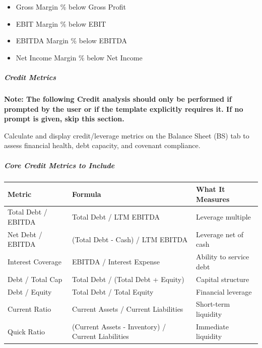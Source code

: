 \documentclass[11pt]{article}
\begin{document}
\begin{itemize}[leftmargin=*,itemsep=2pt,topsep=2pt]
\item {} Gross Margin \% below Gross Profit
\item {} EBIT Margin \% below EBIT
\item {} EBITDA Margin \% below EBITDA
\item {} Net Income Margin \% below Net Income
\end{itemize}

\subparagraph{Credit Metrics}\mbox{}\par

\textbf{Note: The following Credit analysis should only be performed if prompted by the user or if the template explicitly requires it. If no prompt is given, skip this section.}


Calculate and display credit/leverage metrics on the Balance Sheet (BS) tab to assess financial health, debt capacity, and covenant compliance.


\subparagraph{Core Credit Metrics to Include}\mbox{}\par

\begingroup
\small
\setlength{\tabcolsep}{2pt}
\begin{longtable}{>{\RaggedRight\arraybackslash\hspace{0pt}}p{}>{\RaggedRight\arraybackslash\hspace{0pt}}p{}>{\RaggedRight\arraybackslash\hspace{0pt}}p{}}
\toprule
{} \textbf{Metric} & \textbf{Formula} & \textbf{What It Measures} \\
\midrule
{} Total Debt /  EBITDA & Total Debt /  LTM EBITDA & Leverage multiple \\
{} Net Debt /  EBITDA & (Total Debt - Cash) /  LTM EBITDA & Leverage net of cash \\
{} Interest Coverage & EBITDA /  Interest Expense & Ability to service debt \\
{} Debt /  Total Cap & Total Debt /  (Total Debt + Equity) & Capital structure \\
{} Debt /  Equity & Total Debt /  Total Equity & Financial leverage \\
{} Current Ratio & Current Assets /  Current Liabilities & Short-term liquidity \\
{} Quick Ratio & (Current Assets - Inventory) /  Current Liabilities & Immediate liquidity \\
\bottomrule
\end{longtable}
\endgroup
\end{document}
